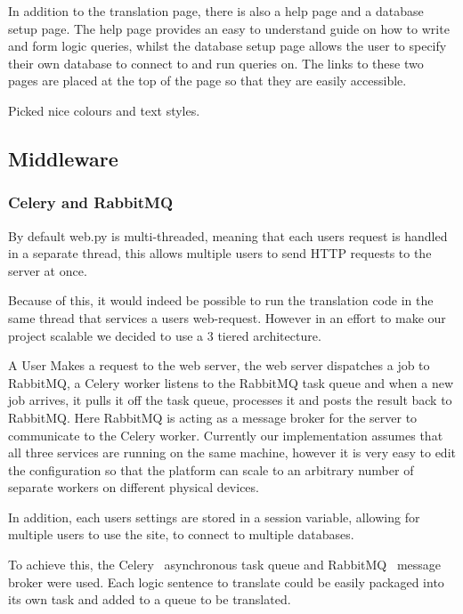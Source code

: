 \documentclass[a4paper, 11pt]{article}
\begin{document}
      In addition to the translation page, there is also a help page and a
      database setup page. The help page provides an easy to understand guide
      on how to write and form logic queries, whilst the database setup page
      allows the user to specify their own database to connect to and run
      queries on. The links to these two pages are placed at the top of the page
      so that they are easily accessible.
 
      Picked nice colours and text styles.

  \subsection{Middleware}
    \subsubsection{Celery and RabbitMQ}
      By default web.py is multi-threaded, meaning that each users request is
      handled in a separate thread, this allows multiple users to send HTTP
      requests to the server at once. 
      
      Because of this, it would indeed be possible to run the translation code 
      in the same thread that services a users web-request. However in an effort 
      to make our project scalable we decided to use a 3 tiered architecture. 
      
      A User Makes a request to the web server, the web server dispatches a job 
      to RabbitMQ, a Celery worker listens to the RabbitMQ task queue and when a 
      new job arrives, it pulls it off the task queue, processes it and posts the 
      result back to RabbitMQ. Here RabbitMQ is acting as a message broker for the
      server to communicate to the Celery worker. Currently our implementation 
      assumes that all three services are running on the same machine, however it
      is very easy to edit the configuration so that the platform can scale to an 
      arbitrary number of separate workers on different physical devices.

      In addition, each users settings are stored in a session variable,
      allowing for multiple users to use the site, to connect to multiple
      databases.


      To achieve this, the Celery~\cite{celery} asynchronous
      task queue and RabbitMQ~\cite{rabbitmq} message broker were
      used. Each logic sentence to translate could be easily packaged into its
      own task and added to a queue to be translated.
\end{document}

